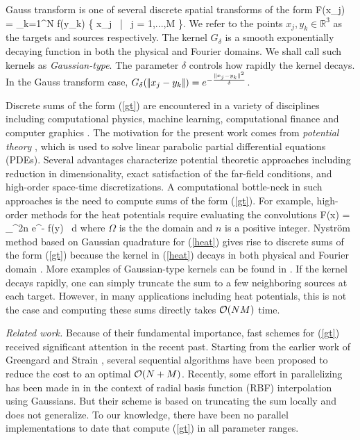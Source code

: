 Gauss transform is one of several discrete spatial transforms of the form 
%
\beq F(x_j) = \sum_{k=1}^N  f(y_k) \quad {} \quad \{ x_j \, | \, j = 1,...,M \}.  \label{gt} \eeq
%
We refer to the points $ x_j, y_k \in \mathbb{R}^3 $ as the targets and sources respectively. The kernel $G_\delta$ is a smooth exponentially decaying function in both the physical and Fourier domains. We shall call such kernels as {\em Gaussian-type}. The parameter $\delta$ controls how rapidly the kernel decays.  In the Gauss transform case, $G_\delta (|\!| x_j - y_k |\!|) = e^{-\frac{|\!| x_j - y_k |\!|^2}{\delta}}$. 

Discrete sums of the form (\ref{gt}) are encountered in a variety of disciplines including computational physics,
 machine learning, computational finance and computer graphics \cite{strain94adap, elgammal03, broadie03, kim05, veerapaneni08}. The 
 motivation for the present work comes from {\em potential theory} \cite{kress99}, which is used to solve linear parabolic partial 
 differential equations (PDEs). Several advantages characterize potential theoretic approaches including reduction in dimensionality, exact 
 satisfaction of the far-field conditions, and high-order space-time discretizations. A computational bottle-neck in such approaches is the 
 need to compute sums of the form (\ref{gt}). For example, high-order methods for the heat potentials require evaluating the convolutions \cite{li09, skv09}
% 
\beq F(x) = \int_\Omega {}^{2n} e^{-} f(y) \, d\Omega \label{heat} \eeq
% 
where $\Omega$ is the the domain and $n$ is a positive integer. Nystr\"{o}m method based on Gaussian quadrature for (\ref{heat}) gives rise to discrete sums of the form (\ref{gt}) because the kernel in (\ref{heat}) decays in both physical and Fourier domain \cite{fggt}. More examples of Gaussian-type kernels can be found in \cite{victor03}. If the kernel decays rapidly, one can simply truncate the sum to a few neighboring sources at each target. However, in many applications including heat potentials, this is not the case and computing these sums directly takes $\mathcal{O}(NM)$ time. 

{\em Related work.} Because of their fundamental importance, fast schemes for (\ref{gt}) received significant attention in the recent past. Starting from the earlier work of Greengard and Strain \cite{fgt}, several sequential algorithms \cite{greengard98, sun02, duraiswami03, tausch09, fggt} have been proposed to reduce the cost to an optimal $\mathcal{O}(N+M)$. Recently, some effort in parallelizing has been made in \cite{rio09} in the context of radial basis function (RBF) interpolation using Gaussians. But their scheme is based on truncating the sum locally and does not generalize. To our knowledge, there have been no parallel implementations to date that compute (\ref{gt}) in all parameter ranges. 

